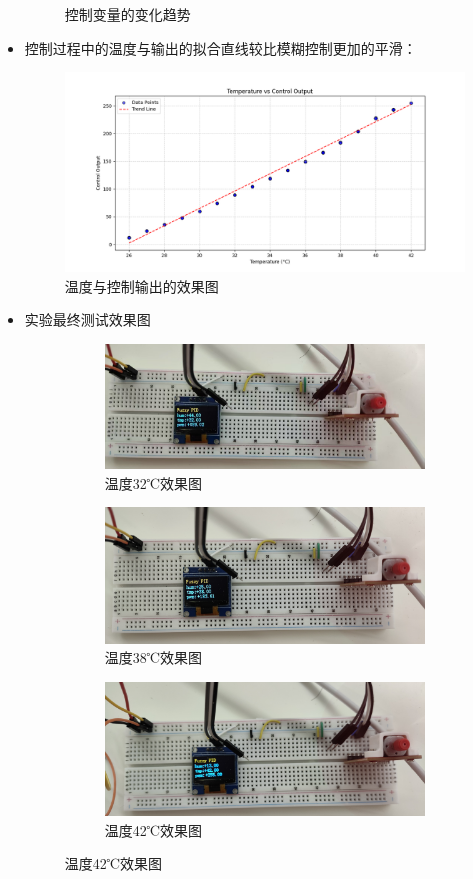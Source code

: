 \documentclass[UTF8]{ctexart}
\begin{document}
\begin{itemize}
\begin{figure}[htbp]
			\caption{控制变量的变化趋势}
			\label{fig:bianhua}
		\end{figure}
		\item 控制过程中的温度与输出的拟合直线较比模糊控制更加的平滑：
		\newpage
		\begin{figure}[htbp]
			\centering
			\includegraphics[width=1\linewidth]{figure/fuzzypid}
			\caption{温度与控制输出的效果图}
			\label{fig:hua}
		\end{figure}
		\item 实验最终测试效果图\newpage
				\begin{figure}[htbp]
					\centering
					\begin{subfigure}[t]{1\textwidth}
						\centering
						\includegraphics[width=0.55\linewidth]{figure/s}
						\caption{温度32℃效果图}
						\label{fig:z0}
					\end{subfigure}
					\begin{subfigure}[t]{1\textwidth}
						\centering
						\includegraphics[width=0.55\linewidth]{figure/m}
						\caption{温度38℃效果图}
						\label{fig:z2}
					\end{subfigure}
					\begin{subfigure}[t]{1\textwidth}
						\centering
						\includegraphics[width=0.55\linewidth]{figure/h}
						\caption{温度42℃效果图}
						\label{fig:z3}
					\end{subfigure}
				\end{figure}
	\end{itemize}
	
\end{document}
